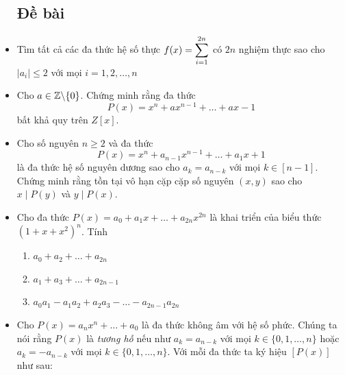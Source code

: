 \documentclass[11pt]{scrartcl}
\begin{document}
\begin{itemize}[label=, leftmargin=0em, itemsep=0.5em]
        \subsection{\LARGE \textcolor{dk}{Đề bài}}
        \item \begin{btvn}
            Tìm tất cả các đa thức hệ số thực $f(x) = \displaystyle\sum_{i = 1}^{2n}$ có $2n$ nghiệm thực sao cho $|a_i| \leq 2$ với mọi $i = 1,2,\dots,n$
        \end{btvn}
        \item \begin{btvn}
            Cho $a \in \mathbb{Z}\backslash \{0\}$. Chứng minh rằng đa thức
            \[
                P(x) = x^n + ax^{n - 1} + \dots + ax - 1
            \]
            bất khả quy trên $Z[x]$.
        \end{btvn}
        \item \begin{btvn} Cho số nguyên $n \geq 2$ và đa thức
        \[
            P(x) = x^n + a_{n - 1}x^{n - 1} +\dots + a_1x+1
        \]
        là đa thức hệ số nguyên dương sao cho $a_k = a_{n - k}$ với mọi $k \in [n - 1]$. Chứng minh rằng tồn tại vô hạn cặp cặp số nguyên $(x,y)$ sao cho $x \mid P(y)$ và $y \mid P(x)$.
        \end{btvn}
        \item \begin{btvn}
            Cho đa thức $P(x) = a_0 + a_1x + \dots + a_{2n}x^{2n}$ là khai triển của biểu thức $(1 + x + x^2)^n$. Tính
            \begin{enumerate}[label=(\alph*)]
                \item $a_0 + a_2 + \dots + a_{2n}$
                \item $a_1 + a_3 + \dots + a_{2n - 1}$
                \item $a_0a_1 - a_1a_2 + a_2a_3 -\dots- a_{2n - 1}a_{2n}$
            \end{enumerate}
        \end{btvn}
        \item \begin{btvn}
            Cho $P(x) = a_nx^n + \dots + a_0$ là đa thức không âm với hệ số phức. Chúng ta nói rằng $P(x)$ là \textit{tương hỗ} nếu như $a_k = a_{n - k}$ với mọi $k \in \{0,1,\dots,n\}$ hoặc $a_k = -a_{n - k}$ với mọi $k \in \{0,1,\dots,n\}$. Với mỗi đa thức ta ký hiệu $[P(x)]$ như sau: 
            \begin{enumerate}

\end{enumerate}
\end{btvn}
\end{itemize}
\end{document}
